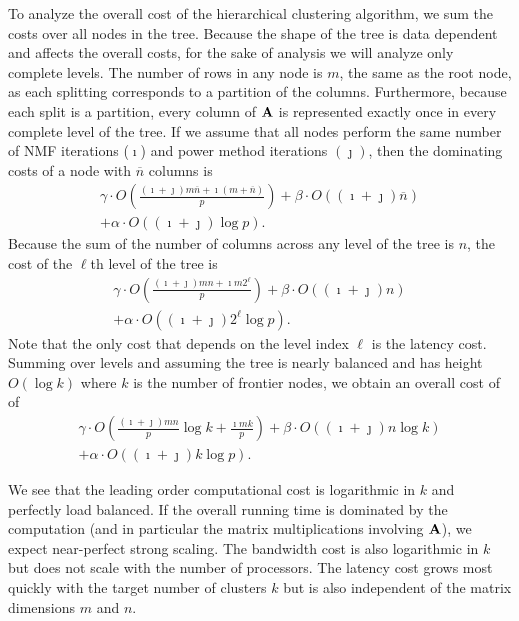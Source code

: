 \documentclass[conference,compsoc]{IEEEtran}
\begin{document}
To analyze the overall cost of the hierarchical clustering algorithm, we sum the costs over all nodes in the tree.
Because the shape of the tree is data dependent and affects the overall costs, for the sake of analysis we will analyze only complete levels.
The number of rows in any node is $m$, the same as the root node, as each splitting corresponds to a partition of the columns.
Furthermore, because each split is a partition, every column of $\M{A}$ is represented exactly once in every complete level of the tree.
If we assume that all nodes perform the same number of NMF iterations ($\imath$) and power method iterations $(\jmath)$, then the dominating costs of a node with $\overline{n}$ columns is
\begin{equation*}
\label{eq:nodecost}
\begin{split}
\gamma \cdot O\left( \frac{(\imath+\jmath) m\overline{n} + \imath (m+\overline{n}) }{p} \right) + \beta \cdot O((\imath+\jmath) \overline{n}) \\ + \alpha \cdot O((\imath+\jmath) \log p).
\end{split}
\end{equation*}
Because the sum of the number of columns across any level of the tree is $n$, the cost of the $\ell$th level of the tree is
\begin{equation*}
\label{eq:levelcost}
\begin{split}
\gamma \cdot O\left( \frac{(\imath+\jmath) mn + \imath m 2^\ell}{p} \right) + \beta \cdot O((\imath+\jmath) n) \\ + \alpha \cdot O((\imath+\jmath) 2^\ell \log p).
\end{split}
\end{equation*}
Note that the only cost that depends on the level index $\ell$ is the latency cost.
Summing over levels and assuming the tree is nearly balanced and has height $O(\log k)$ where $k$ is the number of frontier nodes, we obtain an overall cost of  of
\begin{equation*}
\label{eq:treecost}
\begin{split}
\gamma \cdot O\left( \frac{(\imath+\jmath) mn}{p}  \log k + \frac{\imath mk}{p} \right) + \beta \cdot O((\imath+\jmath) n \log k) \\ + \alpha \cdot O((\imath+\jmath) k \log p).
\end{split}
\end{equation*}

We see that the leading order computational cost is logarithmic in $k$ and perfectly load balanced.
If the overall running time is dominated by the computation (and in particular the matrix multiplications involving $\M{A}$), we expect near-perfect strong scaling.
The bandwidth cost is also logarithmic in $k$ but does not scale with the number of processors.
The latency cost grows most quickly with the target number of clusters $k$ but is also independent of the matrix dimensions $m$ and $n$.
\end{document}
